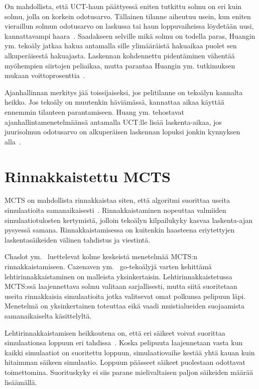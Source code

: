 \documentclass[12pt,finnish]{tktltiki2}
\theoremstyle{definition}
\theoremstyle{remark}
\begin{document}
On mahdollista, että UCT-haun päättyessä eniten tutkittu solmu on eri kuin solmu, jolla on korkein odotusarvo. Tällainen tilanne aiheutuu usein, kun eniten vieraillun solmun odotusarvo on laskussa tai haun loppuvaiheissa löydetään uusi, kannattavampi haara~\cite{huang}. Saadakseen selville mikä solmu on todella paras, Huangin ym. tekoäly jatkaa hakua antamalla sille ylimääräistä hakuaikaa puolet sen alkuperäisestä hakuajasta. Laskennan kohdennettu pidentäminen vähentää myöhempien siirtojen peliaikaa, mutta parantaa Huangin ym. tutkimuksen mukaan voittoprosenttia~\cite{huang}.

Ajanhallinnan merkitys jää toissijaiseksi, jos pelitilanne on tekoälyn kannalta heikko. Jos tekoäly on muutenkin häviämässä, kannattaa aikaa käyttää ennemmin tilanteen parantamiseen. Huang ym. tehostavat ajanhallintamenetelmäänsä antamalla UCT:lle lisää laskenta-aikaa, jos juurisolmun odotusarvo on alkuperäisen laskennan lopuksi jonkin kynnyksen alla~\cite{huang}. 

\section{Rinnakkaistettu MCTS}

MCTS on mahdollista rinnakkaistaa siten, että algoritmi suorittaa useita simulaatioita samanaikaisesti~\cite{browne, cazenave}. Rinnakkaistaminen nopeuttaa valmiiden simulaatiotulosten kertymistä, jolloin tekoälyn kilpailukyky kasvaa laskenta-ajan pysyessä samana. Rinnakkaistamisessa on kuitenkin haasteena eriytettyjen laskentasäikeiden välinen tahdistus ja viestintä.

Chaslot ym.~\cite{chaslot} luettelevat kolme keskeistä menetelmää MCTS:n rinnakkaistamiseen. Cazenaven ym.~\cite{cazenave} go-tekoälyjä varten kehittämä lehtirinnakkaistaminen on malleista yksinkertaisin. Lehtirinnakkaistetussa MCTS:ssä laajennettava solmu valitaan sarjallisesti, mutta siitä suoritetaan useita rinnakkaisia simulaatioita jotka valitsevat omat polkunsa pelipuun läpi. Menetelmä on yksinkertainen toteuttaa eikä vaadi muistialueiden suojaamista samanaikaiselta käsittelyltä.

Lehtirinnakkaistamisen heikkoutena on, että eri säikeet voivat suorittaa simulaationsa loppuun eri tahdissa~\cite{chaslot}. Koska pelipuuta laajennetaan vasta kun kaikki simulaatiot on suoritettu loppuun, simulaatiovaihe kestää yhtä kauan kuin hitaimman säikeen simulaatio. Loppuun päässeet säikeet puolestaan odottavat toimettomina. Suorituskyky ei siis parane mielivaltaisen paljon säikeiden määrää lisäämällä.
\end{document}
